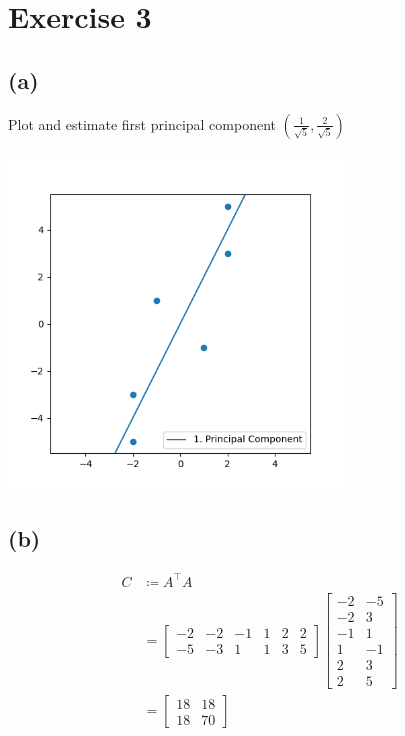 \documentclass[12pt]{article}
\begin{document}
\section*{Exercise 3}
\subsection*{(a)}
Plot and estimate first principal component $(\frac{1}{\sqrt{5}}, \frac{2}{\sqrt{5}})$
\begin{center}
	\includegraphics[width=3.5in]{code/exercise_03_a.png}
\end{center}

\subsection*{(b)}
\begin{align*}
	C &\coloneqq A^\top A \\
	&= \left[ \begin{array}{cccccc}
		-2 & -2 & -1 & 1 & 2 & 2 \\
		-5 & -3 & 1 & 1 & 3 & 5
	\end{array} \right] \left[ \begin{array}{cc}
		-2 & -5 \\
		-2 & 3 \\
		-1 & 1 \\
		1 & -1 \\
		2 & 3 \\
		2 & 5
	\end{array} \right] \\
	&= \left[ \begin{array}{cc}
		18 & 18 \\
		18 & 70
	\end{array} \right]
\end{align*}
\end{document}
